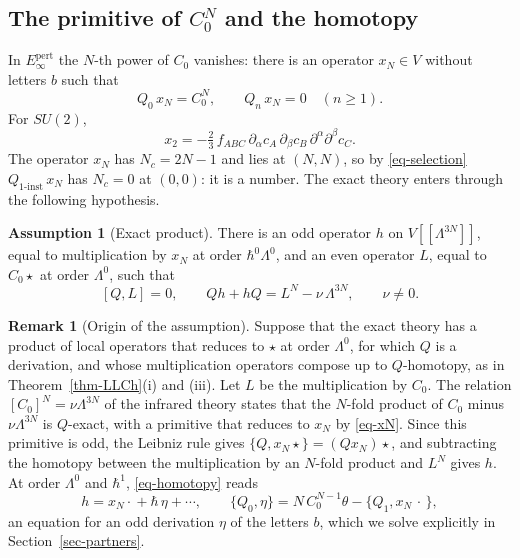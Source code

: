 \documentclass[11pt]{article}
\numberwithin{equation}{section}
\numberwithin{figure}{section}
\numberwithin{table}{section}
\theoremstyle{definition}
\newtheorem{assumption}[theorem]{Assumption}
\newtheorem{remark}[theorem]{Remark}
\newcommand{\Qi}{Q_{1\text{-}\mathrm{inst}}}
\newcommand{\Ep}{E_\infty^{\mathrm{pert}}}
\begin{document}
\subsection{The primitive of $C_0^N$ and the homotopy}\label{sec-homotopy}

In $\Ep$ the $N$-th power of $C_0$ vanishes: there is an operator $x_N\in V$ without letters $b$ such that
\begin{equation}\label{eq-xN}
Q_0\,x_N=C_0^N,\qquad Q_n\,x_N=0\quad(n\ge1).
\end{equation}
For $SU(2)$,
\begin{equation}\label{eq-x2}
x_2=-\tfrac23\,f_{ABC}\,\partial_\alpha c_A\,\partial_\beta c_B\,\partial^\alpha\partial^\beta c_C .
\end{equation}
The operator $x_N$ has $N_c=2N-1$ and lies at $(N,N)$, so by \eqref{eq-selection} $\Qi\,x_N$ has $N_c=0$ at $(0,0)$: it is a number. The exact theory enters through the following hypothesis.

\begin{assumption}[Exact product]\label{ass-exact}
There is an odd operator $h$ on $V[[\Lambda^{3N}]]$, equal to multiplication by $x_N$ at order $\hbar^0\Lambda^0$, and an even operator $L$, equal to $C_0\star{}$ at order $\Lambda^0$, such that
\begin{equation}\label{eq-homotopy}
[Q,L]=0,\qquad Qh+hQ=L^N-\nu\,\Lambda^{3N},\qquad \nu\neq0 .
\end{equation}
\end{assumption}

\begin{remark}[Origin of the assumption]\label{rem-origin}
Suppose that the exact theory has a product of local operators that reduces to $\star$ at order $\Lambda^0$, for which $Q$ is a derivation, and whose multiplication operators compose up to $Q$-homotopy, as in Theorem~\ref{thm-LLCh}(i) and (iii). Let $L$ be the multiplication by $C_0$. The relation $[C_0]^N=\nu\Lambda^{3N}$ of the infrared theory \cite{VY} states that the $N$-fold product of $C_0$ minus $\nu\Lambda^{3N}$ is $Q$-exact, with a primitive that reduces to $x_N$ by \eqref{eq-xN}. Since this primitive is odd, the Leibniz rule gives $\{Q,x_N\star{}\}=(Qx_N)\star{}$, and subtracting the homotopy between the multiplication by an $N$-fold product and $L^N$ gives $h$. At order $\Lambda^0$ and $\hbar^1$, \eqref{eq-homotopy} reads
\begin{equation}\label{eq-eta}
h=x_N\cdot{}+\hbar\,\eta+\cdots,\qquad \{Q_0,\eta\}=N\,C_0^{N-1}\theta-\{Q_1,x_N\,\cdot\,\},
\end{equation}
an equation for an odd derivation $\eta$ of the letters $b$, which we solve explicitly in Section~\ref{sec-partners}.
\end{remark}
\end{document}
